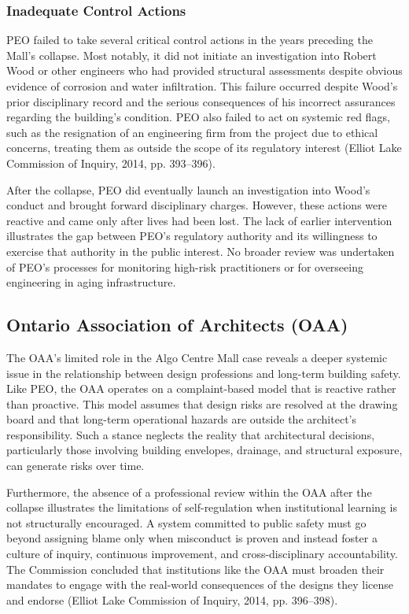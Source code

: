 \documentclass[12pt]{article}
\begin{document}
\subsubsection*{Inadequate Control Actions}
PEO failed to take several critical control actions in the years preceding the Mall’s collapse. Most notably, it did not initiate an investigation into Robert Wood or other engineers who had provided structural assessments despite obvious evidence of corrosion and water infiltration. This failure occurred despite Wood’s prior disciplinary record and the serious consequences of his incorrect assurances regarding the building’s condition. PEO also failed to act on systemic red flags, such as the resignation of an engineering firm from the project due to ethical concerns, treating them as outside the scope of its regulatory interest (Elliot Lake Commission of Inquiry, 2014, pp. 393–396).

After the collapse, PEO did eventually launch an investigation into Wood’s conduct and brought forward disciplinary charges. However, these actions were reactive and came only after lives had been lost. The lack of earlier intervention illustrates the gap between PEO’s regulatory authority and its willingness to exercise that authority in the public interest. No broader review was undertaken of PEO’s processes for monitoring high-risk practitioners or for overseeing engineering in aging infrastructure.

\subsection{Ontario Association of Architects (OAA)}
The OAA’s limited role in the Algo Centre Mall case reveals a deeper systemic issue in the relationship between design professions and long-term building safety. Like PEO, the OAA operates on a complaint-based model that is reactive rather than proactive. This model assumes that design risks are resolved at the drawing board and that long-term operational hazards are outside the architect’s responsibility. Such a stance neglects the reality that architectural decisions, particularly those involving building envelopes, drainage, and structural exposure, can generate risks over time.

Furthermore, the absence of a professional review within the OAA after the collapse illustrates the limitations of self-regulation when institutional learning is not structurally encouraged. A system committed to public safety must go beyond assigning blame only when misconduct is proven and instead foster a culture of inquiry, continuous improvement, and cross-disciplinary accountability. The Commission concluded that institutions like the OAA must broaden their mandates to engage with the real-world consequences of the designs they license and endorse (Elliot Lake Commission of Inquiry, 2014, pp. 396–398).
\end{document}
